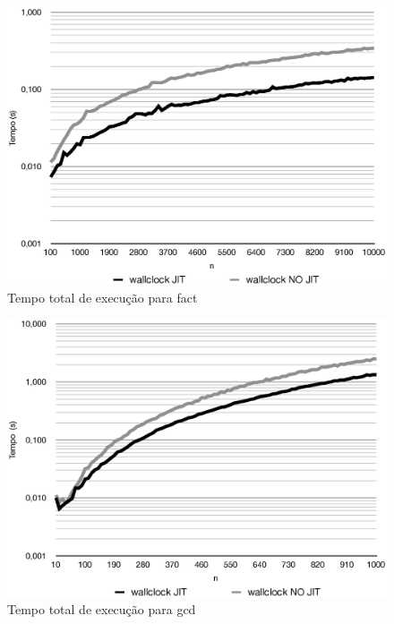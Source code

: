 \begin{figure}[ht!]
  \centering
  \includegraphics[scale=0.70]{figs/fact_tempo}
  \caption{Tempo total de execução para fact \label{fig:fact-tempo}}
\end{figure}
\begin{figure}[ht!]
  \centering
  \includegraphics[scale=0.70]{figs/gcd_tempo}
  \caption{Tempo total de execução para gcd \label{fig:gcd-tempo}}
\end{figure}
